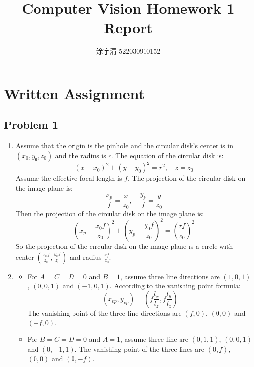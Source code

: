 \documentclass[bwprint]{gmcmthesis}
\title{Computer Vision Homework 1 Report}
\author{涂宇清 522030910152}
\date{}
\numberwithin{figure}{section}
\begin{document}
\setlength{\parskip}{10pt}
\baselineskip
\maketitle

\section{Written Assignment}
\subsection{Problem 1}
\begin{enumerate}[label=\alph*.]
    \item Assume that the origin is the pinhole and the circular disk's center is in $(x_0, y_0, z_0)$ and the radius is $r$. The equation of the circular disk is:
    \begin{equation}
        (x - x_0)^2 + (y - y_0)^2 = r^2, \quad z = z_0
    \end{equation}
    Assume the effective focal length is $f$. The projection of the circular disk on the image plane is:
    \begin{equation}
        \frac{x_p}{f} = \frac{x}{z_0}, \quad \frac{y_p}{f} = \frac{y}{z_0}
    \end{equation}
    Then the projection of the circular disk on the image plane is:
    \begin{equation}
        \left(x_p - \frac{x_0f}{z_0}\right)^2 + \left(y_p - \frac{y_0f}{z_0}\right)^2 = \left(\frac{rf}{z_0}\right)^2
    \end{equation}
    So the projection of the circular disk on the image plane is a circle with center $(\frac{x_0f}{z_0}, \frac{y_0f}{z_0})$ and radius $\frac{rf}{z_0}$.

    \item \begin{itemize}
        \item For $A=C=D=0$ and $B=1$, assume three line directions are $(1, 0, 1)$, $(0, 0, 1)$ and $(-1, 0, 1)$. According to the vanishing point formula:
        \begin{equation}
            \left(x_{vp}, y_{vp}\right) = \left(f\frac{l_x}{l_z}, f\frac{l_y}{l_z}\right)
        \end{equation}
        The vanishing point of the three line directions are $(f, 0)$, $(0, 0)$ and $(-f, 0)$.
        \item For $B=C=D=0$ and $A=1$, assume three line are $(0, 1, 1)$, $(0, 0, 1)$ and $(0, -1, 1)$. The vanishing point of the three lines are $(0, f)$, $(0, 0)$ and $(0, -f)$.
    \end{itemize}


\end{enumerate}
\end{document}
